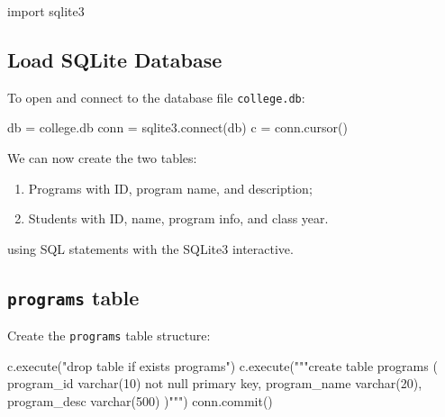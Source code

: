 \documentclass[
  letterpaper,
]{scrbook}
\newenvironment{Shaded}{\begin{snugshade}}{\end{snugshade}}
\newcommand{\ExtensionTok}[1]{\textcolor[rgb]{0.00,0.23,0.31}{#1}}
\newcommand{\ImportTok}[1]{\textcolor[rgb]{0.00,0.46,0.62}{#1}}
\newcommand{\NormalTok}[1]{\textcolor[rgb]{0.00,0.23,0.31}{#1}}
\newcommand{\OperatorTok}[1]{\textcolor[rgb]{0.37,0.37,0.37}{#1}}
\newcommand{\StringTok}[1]{\textcolor[rgb]{0.13,0.47,0.30}{#1}}
\providecommand{\tightlist}{%
  \setlength{\itemsep}{0pt}\setlength{\parskip}{0pt}}
\begin{document}
\begin{Shaded}
\begin{Highlighting}[]
\ImportTok{import}\NormalTok{ sqlite3}
\end{Highlighting}
\end{Shaded}

\subsection*{Load SQLite Database}\label{load-sqlite-database-1}

To open and connect to the database file \texttt{college.db}:

\begin{Shaded}
\begin{Highlighting}[]
\NormalTok{db }\OperatorTok{=} \StringTok{\textquotesingle{}college.db\textquotesingle{}}
\NormalTok{conn }\OperatorTok{=}\NormalTok{ sqlite3.}\ExtensionTok{connect}\NormalTok{(db)}
\NormalTok{c }\OperatorTok{=}\NormalTok{ conn.cursor()}
\end{Highlighting}
\end{Shaded}

We can now create the two tables:

\begin{enumerate}
\def\labelenumi{\arabic{enumi}.}
\tightlist
\item
  Programs with ID, program name, and description;
\item
  Students with ID, name, program info, and class year.
\end{enumerate}

using SQL statements with the SQLite3 interactive.

\subsection*{\texorpdfstring{\texttt{programs}
table}{programs table}}\label{programs-table-1}

Create the \texttt{programs} table structure:

\begin{Shaded}
\begin{Highlighting}[]
\NormalTok{c.execute(}\StringTok{"drop table if exists programs"}\NormalTok{)}
\NormalTok{c.execute(}\StringTok{"""create table programs (}
\StringTok{                program\_id varchar(10) not null primary key, }
\StringTok{                program\_name varchar(20), }
\StringTok{                program\_desc varchar(500)}
\StringTok{            )"""}\NormalTok{)}
\NormalTok{conn.commit()}
\end{Highlighting}
\end{Shaded}
\end{document}
